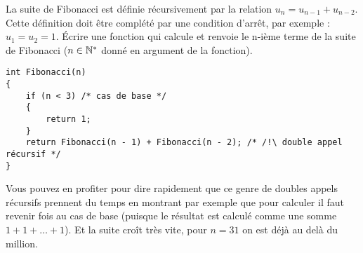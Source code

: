\begin{newenu}
\begin{correction}
  \end{correction}

\item La suite de Fibonacci est définie récursivement par la relation $u_n = u_{n - 1} + u_{n - 2}$. Cette définition doit être complété par une condition d'arrêt, par exemple : $u_1 = u_2 = 1$. Écrire une fonction qui calcule et renvoie le n-ième terme de la suite de Fibonacci ($n\in\mathbb{N}^{\ast}$ donné en argument de la fonction). 


  \begin{correction}
\begin{verbatim}
int Fibonacci(n)
{
    if (n < 3) /* cas de base */
    {
        return 1;
    }
    return Fibonacci(n - 1) + Fibonacci(n - 2); /* /!\ double appel récursif */
}
\end{verbatim}

Vous pouvez en profiter pour dire rapidement que ce genre de doubles appels récursifs prennent du temps en montrant par exemple que pour calculer  il faut revenir  fois au cas de base (puisque le résultat est calculé comme une somme $1+ 1+ \ldots + 1$). Et la suite croît très vite, pour $n = 31$ on est déjà au delà du million. 
  \end{correction}


\end{newenu}
